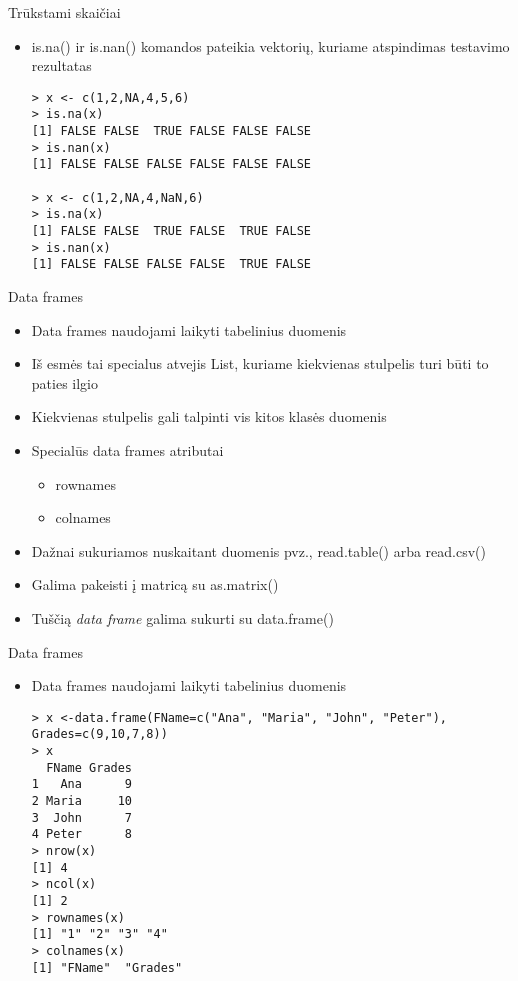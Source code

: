 \documentclass[11pt,xcolor=table]{beamer}
\begin{document}

\begin{frame}[fragile]{Trūkstami skaičiai}
\begin{itemize}
\item is.na() ir is.nan() komandos pateikia vektorių, kuriame atspindimas testavimo rezultatas
\begin{lstlisting}
> x <- c(1,2,NA,4,5,6)
> is.na(x)
[1] FALSE FALSE  TRUE FALSE FALSE FALSE
> is.nan(x)
[1] FALSE FALSE FALSE FALSE FALSE FALSE

> x <- c(1,2,NA,4,NaN,6)
> is.na(x)
[1] FALSE FALSE  TRUE FALSE  TRUE FALSE
> is.nan(x)
[1] FALSE FALSE FALSE FALSE  TRUE FALSE
\end{lstlisting}
\end{itemize}
\end{frame}


\begin{frame}[fragile]{Data frames}
\begin{itemize}
\item Data frames naudojami laikyti tabelinius duomenis
\item Iš esmės tai specialus atvejis List, kuriame kiekvienas stulpelis turi būti to paties ilgio
\item Kiekvienas stulpelis gali talpinti vis kitos klasės duomenis
\item Specialūs data frames atributai
\begin{itemize}
\item rownames
\item colnames
\end{itemize}
\item Dažnai sukuriamos nuskaitant duomenis pvz., read.table() arba read.csv()
\item Galima pakeisti į matricą su as.matrix()
\item Tuščią \textit{data frame} galima sukurti su data.frame()
\end{itemize}
\end{frame}


\begin{frame}[fragile]{Data frames}
\begin{itemize}
\item Data frames naudojami laikyti tabelinius duomenis
\begin{lstlisting}
> x <-data.frame(FName=c("Ana", "Maria", "John", "Peter"), Grades=c(9,10,7,8))
> x
  FName Grades
1   Ana      9
2 Maria     10
3  John      7
4 Peter      8
> nrow(x)
[1] 4
> ncol(x)
[1] 2
> rownames(x)
[1] "1" "2" "3" "4"
> colnames(x)
[1] "FName"  "Grades"
\end{lstlisting}
\end{itemize}
\end{frame}
\end{document}
